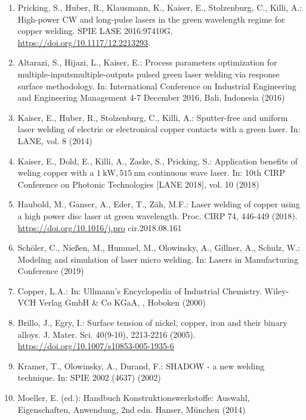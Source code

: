 \documentclass[10pt]{article}
\begin{document}
\begin{enumerate}
  \item Pricking, S., Huber, R., Klausmann, K., Kaiser, E., Stolzenburg, C., Killi, A.: High-power $\mathrm{CW}$ and long-pulse lasers in the green wavelength regime for copper welding. SPIE LASE 2016:97410G. \href{https://doi.org/10.1117/12.2213293}{https://doi.org/10.1117/12.2213293}.

  \item Altarazi, S., Hijazi, L., Kaiser, E.: Process parameters optimization for multiple-inputsmultiple-outputs pulsed green laser welding via response surface methodology. In: International Conference on Industrial Engineering and Engineering Management 4-7 December 2016, Bali, Indonesia (2016)

  \item Kaiser, E., Huber, R., Stolzenburg, C., Killi, A.: Sputter-free and uniform laser welding of electric or electronical copper contacts with a green laser. In: LANE, vol. 8 (2014)

  \item Kaiser, E., Dold, E., Killi, A., Zaske, S., Pricking, S.: Application benefits of weling copper with a $1 \mathrm{~kW}, 515 \mathrm{~nm}$ continuous wave laser. In: 10th CIRP Conference on Photonic Technologies [LANE 2018], vol. 10 (2018)

  \item Haubold, M., Ganser, A., Eder, T., Zäh, M.F.: Laser welding of copper using a high power disc laser at green wavelength. Proc. CIRP 74, 446-449 (2018). \href{https://doi.org/10.1016/j.pro}{https://doi.org/10.1016/j.pro} cir.2018.08.161

  \item Schöler, C., Nießen, M., Hummel, M., Olowinsky, A., Gillner, A., Schulz, W.: Modeling and simulation of laser micro welding. In: Lasers in Manufacturing Conference (2019)

  \item Copper, L.A.: In: Ullmann's Encyclopedia of Industrial Chemistry. Wiley-VCH Verlag GmbH \& Co KGaA, , Hoboken (2000)

  \item Brillo, J., Egry, I.: Surface tension of nickel, copper, iron and their binary alloys. J. Mater. Sci. 40(9-10), 2213-2216 (2005). \href{https://doi.org/10.1007/s10853-005-1935-6}{https://doi.org/10.1007/s10853-005-1935-6}

  \item Kramer, T., Olowinsky, A., Durand, F.: SHADOW - a new welding technique. In: SPIE 2002 (4637) (2002)

  \item Moeller, E. (ed.): Handbuch Konstruktionswerkstoffe: Auswahl, Eigenschaften, Anwendung, 2nd edn. Hanser, München (2014)

\end{enumerate}
\end{document}
